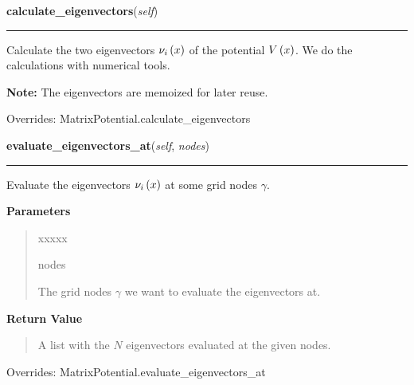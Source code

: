 \hspace{.8\funcindent}\begin{boxedminipage}{\funcwidth}

    \raggedright \textbf{calculate\_eigenvectors}(\textit{self})

    \vspace{-1.5ex}

    \rule{\textwidth}{0.5\fboxrule}
\setlength{\parskip}{2ex}
    Calculate the two eigenvectors $\nu_i\left( x \right)$ of the
    potential $V\left( x \right)$. We do the calculations with
    numerical tools.

\setlength{\parskip}{1ex}

\textbf{Note:} The eigenvectors are memoized for later reuse.

      Overrides: MatrixPotential.calculate\_eigenvectors




    \end{boxedminipage}

    \vspace{0.5ex}

\hspace{.8\funcindent}\begin{boxedminipage}{\funcwidth}

    \raggedright \textbf{evaluate\_eigenvectors\_at}(\textit{self}, \textit{nodes})

    \vspace{-1.5ex}

    \rule{\textwidth}{0.5\fboxrule}
\setlength{\parskip}{2ex}
    Evaluate the eigenvectors $\nu_i\left( x \right)$ at some
    grid nodes $\gamma$.

\setlength{\parskip}{1ex}
      \textbf{Parameters}
      \vspace{-1ex}

      \begin{quote}
        \begin{Ventry}{xxxxx}

          \item[nodes]

          The grid nodes $\gamma$ we want to evaluate the
          eigenvectors at.

        \end{Ventry}

      \end{quote}

      \textbf{Return Value}
    \vspace{-1ex}

      \begin{quote}
      A list with the $N$ eigenvectors evaluated at the given nodes.

      \end{quote}



      Overrides: MatrixPotential.evaluate\_eigenvectors\_at

    \end{boxedminipage}

